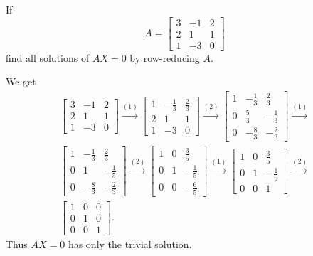  If
\begin{equation*}
  A =
  \begin{bmatrix}
    3 & -1 & 2 \\
    2 & 1 & 1 \\
    1 & -3 & 0
  \end{bmatrix}
\end{equation*}
find all solutions of $AX = 0$ by row-reducing $A$.
\begin{solution}
  We get
  \begin{gather*}
    \begin{bmatrix}
      3 & -1 & 2 \\[3pt]
      2 & 1 & 1 \\[3pt]
      1 & -3 & 0
    \end{bmatrix}
    \xrightarrow{(1)}
    \begin{bmatrix}
      1 & -\frac13 & \frac23 \\[3pt]
      2 & 1 & 1 \\[3pt]
      1 & -3 & 0
    \end{bmatrix}
    \xrightarrow{(2)}
    \begin{bmatrix}
      1 & -\frac13 & \frac23 \\[3pt]
      0 & \frac53 & -\frac13 \\[3pt]
      0 & -\frac83 & -\frac23
    \end{bmatrix}
    \xrightarrow{(1)} \\
    \begin{bmatrix}
      1 & -\frac13 & \frac23 \\[3pt]
      0 & 1 & -\frac15 \\[3pt]
      0 & -\frac83 & -\frac23
    \end{bmatrix}
    \xrightarrow{(2)}
    \begin{bmatrix}
      1 & 0 & \frac35 \\[3pt]
      0 & 1 & -\frac15 \\[3pt]
      0 & 0 & -\frac65
    \end{bmatrix}
    \xrightarrow{(1)}
    \begin{bmatrix}
      1 & 0 & \frac35 \\[3pt]
      0 & 1 & -\frac15 \\[3pt]
      0 & 0 & 1
    \end{bmatrix}
    \xrightarrow{(2)} \\
    \begin{bmatrix}
      1 & 0 & 0 \\
      0 & 1 & 0 \\
      0 & 0 & 1
    \end{bmatrix}.
  \end{gather*}
  Thus $AX = 0$ has only the trivial solution.
\end{solution}

